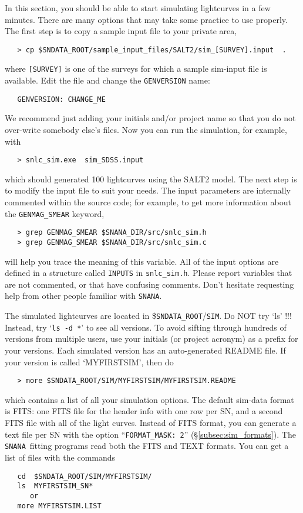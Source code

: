 \documentclass[12pt]{article}
\newcommand{\snana}{{\tt SNANA}}
\newcommand{\sndataroot}{{\tt SNDATA\_ROOT}}
\begin{document}
{In this section, you should be able to start simulating
lightcurves in a few minutes. There are many options that
may take some practice to use properly.
The first step is to copy a sample input file to your
private area,
\begin{verbatim}
   > cp $SNDATA_ROOT/sample_input_files/SALT2/sim_[SURVEY].input  . 
\end{verbatim}
%
where {\tt [SURVEY]} is one of the surveys for which
a sample sim-input file is available.
Edit the file and change the {\tt GENVERSION} name:
\begin{verbatim}
   GENVERSION: CHANGE_ME
\end{verbatim}
We recommend just adding your initials and/or project name
so that you do not over-write somebody else's files.
Now you can run the simulation, for example, with
%
\begin{verbatim}
   > snlc_sim.exe  sim_SDSS.input
\end{verbatim}
%
which should generated 100 lightcurves using the SALT2 model.
The next step is to modify the input file to suit your needs.
The input parameters are internally commented within the
source code; for example, to get more information about
the {\tt GENMAG\_SMEAR} keyword,
%
\begin{verbatim}
   > grep GENMAG_SMEAR $SNANA_DIR/src/snlc_sim.h
   > grep GENMAG_SMEAR $SNANA_DIR/src/snlc_sim.c
\end{verbatim}
%
will help you trace the meaning of this variable.
All of the input options are defined in a structure
called {\tt INPUTS} in {\tt snlc\_sim.h}.
Please report variables that are not commented, or that
have confusing comments.
Don't hesitate requesting help from other people familiar with \snana.

The simulated lightcurves are located in
\$\sndataroot/{\tt SIM}. Do NOT try `ls' !!!
Instead, try `{\tt ls~-d *}' to see all versions.
To avoid sifting through hundreds of versions from multiple
users, use your initials (or project acronym) as a prefix 
for your versions.
%
Each simulated version has an auto-generated README file. 
If your version is called `MYFIRSTSIM', then do
\begin{verbatim}
   > more $SNDATA_ROOT/SIM/MYFIRSTSIM/MYFIRSTSIM.README
\end{verbatim}
%
which contains a list of all your simulation options.
The default sim-data format is FITS: one FITS file for the
header info with one row per SN, and a second FITS
file with all of the light curves. 
Instead of FITS format, you can generate a text file per SN
with the option ``{\tt FORMAT\_MASK: 2}'' 
(\S\ref{subsec:sim_formats}).
The \snana\ fitting programs read both the FITS and TEXT formats.
You can get a list of files with the commands
%
\begin{verbatim}
   cd  $SNDATA_ROOT/SIM/MYFIRSTSIM/
   ls  MYFIRSTSIM_SN*
      or
   more MYFIRSTSIM.LIST
\end{verbatim}


}
\end{document}
